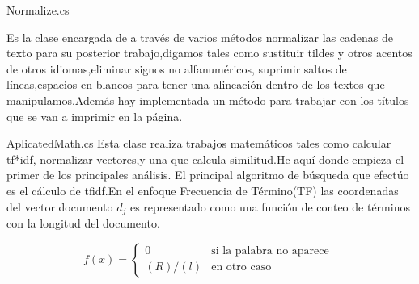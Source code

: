 \begin{frame}[fragile]{Normalize.cs}
  \begin{block}
    Es la clase encargada de a través de varios métodos normalizar las cadenas de
  texto para su posterior trabajo,digamos tales como sustituir tildes y otros
  acentos de otros idiomas,eliminar signos no alfanuméricos,
  suprimir saltos de líneas,espacios en  blancos para tener una
  alineación dentro de los textos que manipulamos.Adem\'as hay implementada
  un método para trabajar con los títulos que se van a imprimir en la p\'agina.
  \end{block}
  
  
\end{frame}

\begin{frame}[fragile]{AplicatedMath.cs}
  Esta clase realiza  trabajos matemáticos tales como calcular tf*idf, normalizar
  vectores,y una que calcula similitud.He aquí donde empieza el primer de los
  principales análisis.
  El principal algoritmo de búsqueda que efectúo es el c\'alculo de tfidf.En el
  enfoque Frecuencia de T\'ermino(TF)  las coordenadas del vector documento $d_j$
  es representado como una  función de conteo de términos con la longitud del
  documento.

  \[
    f(x)=
    \begin{cases}
        0 &\text{si la palabra no aparece } \\
        (R)/(l) &\text{en otro caso }
    \end{cases}
\]
  \end{frame}
    
